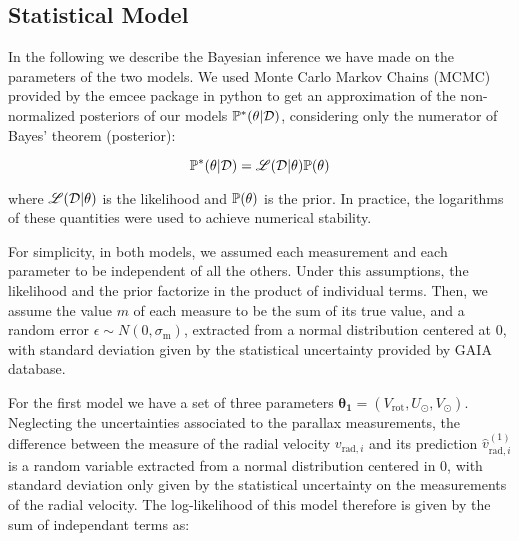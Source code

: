 \subsection{Statistical Model}\label{subsec:StatisticalModel}
In the following we describe the Bayesian inference we have made on the parameters of the two models. We used Monte Carlo Markov Chains (MCMC) provided by the emcee package in python to get an approximation of the non-normalized posteriors of our models $\mathbb{P}^{*}(\theta \vert \mathcal{D})$, considering only the numerator of Bayes' theorem (posterior):

\begin{equation}\label{Eq:NonNormPosterior}
    \mathbb{P}^{*}(\theta \vert \mathcal{D}) = \mathscr{L}(\mathcal{D} \vert \theta) \mathbb{P}(\theta)
\end{equation}

\noindent where $\mathscr{L}(\mathcal{D} \vert \theta)$ is the likelihood and $\mathbb{P}(\theta)$ is the prior. In practice, the logarithms of these quantities were used to achieve numerical stability.

For simplicity, in both models, we assumed each measurement and each parameter to be independent of all the others. Under this assumptions, the likelihood and the prior factorize in the product of individual terms. Then, we assume the value $m$ of each measure to be  the sum of its true value, and a random error $\epsilon \sim N(0, \sigma_\text{m})$, extracted from a normal distribution centered at 0, with standard deviation given by the statistical uncertainty provided by GAIA database.

For the first model we have a set of three parameters $\mathbf{\theta_1} = (V_{\text{rot}}, U_{\odot}, V_{\odot})$.%
Neglecting the uncertainties associated to the parallax measurements, the difference between the measure of the radial velocity $v_{\text{rad}, i}$ and its prediction $\hat{v}^{(1)}_{\text{rad}, i}$ is a random variable extracted from a normal distribution centered in 0, with standard deviation only given by the statistical uncertainty on the measurements of the radial velocity. The log-likelihood of this model therefore is given by the sum of independant terms as:

